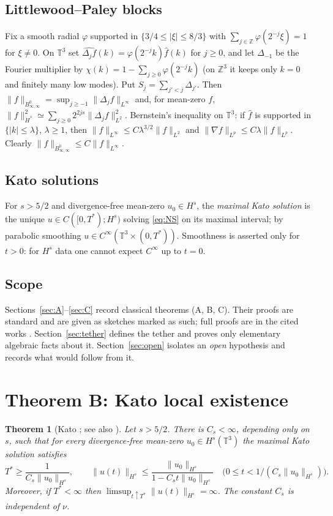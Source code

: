 \documentclass[11pt,reqno]{amsart}
\newtheorem{theorem}{Theorem}
\theoremstyle{definition}
\theoremstyle{remark}
\newcommand{\T}{\mathbb{T}^3}
\newcommand{\Z}{\mathbb{Z}}
\newcommand{\Bz}{B^0_{\infty,\infty}}
\newcommand{\dH}[1]{\dot H^{#1}}
\newcommand{\norm}[1]{\lVert #1\rVert}
\newcommand{\abs}[1]{\lvert #1\rvert}
\begin{document}
\subsection*{Littlewood--Paley blocks}
Fix a smooth radial $\varphi$ supported in $\{3/4\le\abs\xi\le 8/3\}$ with $\sum_{j\in\Z}\varphi(2^{-j}\xi)=1$ for $\xi\neq0$. On $\T$ set $\widehat{\Delta_j f}(k)=\varphi(2^{-j}k)\hat f(k)$ for $j\ge0$, and let $\Delta_{-1}$ be the Fourier multiplier by $\chi(k)=1-\sum_{j\ge0}\varphi(2^{-j}k)$ (on $\Z^3$ it keeps only $k=0$ and finitely many low modes). Put $S_j=\sum_{j'<j}\Delta_{j'}$. Then $\norm{f}_{\Bz}=\sup_{j\ge-1}\norm{\Delta_jf}_{L^\infty}$ and, for mean-zero $f$, $\norm{f}_{\dH{s}}^2\simeq\sum_{j\ge0}2^{2js}\norm{\Delta_jf}_{L^2}^2$. Bernstein's inequality on $\T$: if $\hat f$ is supported in $\{\abs k\le\lambda\}$, $\lambda\ge1$, then $\norm{f}_{L^\infty}\le C\lambda^{3/2}\norm{f}_{L^2}$ and $\norm{\nabla f}_{L^p}\le C\lambda\norm{f}_{L^p}$. Clearly $\norm{f}_{\Bz}\le C\norm{f}_{L^\infty}$.

\subsection*{Kato solutions}
For $s>5/2$ and divergence-free mean-zero $u_0\in H^s$, the \emph{maximal Kato solution} is the unique $u\in C([0,T^*);H^s)$ solving \eqref{eq:NS} on its maximal interval; by parabolic smoothing $u\in C^\infty(\T\times(0,T^*))$. Smoothness is asserted only for $t>0$: for $H^s$ data one cannot expect $C^\infty$ up to $t=0$.

\subsection*{Scope}
Sections~\ref{sec:A}--\ref{sec:C} record classical theorems (A, B, C). Their proofs are standard and are given as sketches marked as such; full proofs are in the cited works \cite{BKM1984,KT2000,KOT2002,Kato1972,FujitaKato1964,KatoPonce1988,Bony1981,BCD2011,MajdaBertozzi2002}. Section~\ref{sec:tether} defines the tether and proves only elementary algebraic facts about it. Section~\ref{sec:open} isolates an \emph{open} hypothesis and records what would follow from it.

\section{Theorem B: Kato local existence}\label{sec:B}

\begin{theorem}[Kato {\cite{Kato1972}}; see also {\cite{KatoPonce1988,MajdaBertozzi2002}}]\label{thm:B}
Let $s>5/2$. There is $C_s<\infty$, depending only on $s$, such that for every divergence-free mean-zero $u_0\in H^s(\T)$ the maximal Kato solution satisfies
\[
T^*\ge\frac{1}{C_s\norm{u_0}_{H^s}},\qquad
\norm{u(t)}_{H^s}\le\frac{\norm{u_0}_{H^s}}{1-C_st\norm{u_0}_{H^s}}\quad\bigl(0\le t<1/(C_s\norm{u_0}_{H^s})\bigr).
\]
Moreover, if $T^*<\infty$ then $\limsup_{t\uparrow T^*}\norm{u(t)}_{H^s}=\infty$. The constant $C_s$ is independent of $\nu$.
\end{theorem}
\end{document}

